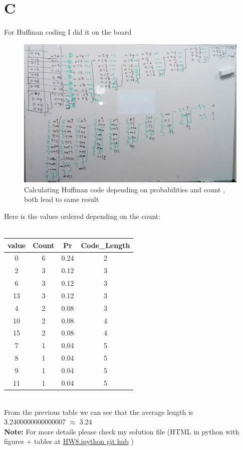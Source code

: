 \documentclass{article}
\begin{document}
 \section *{C}
For Huffman coding I did it on the board 
\begin{figure}[H]
\includegraphics[scale=0.15]{c_modified.jpg}
\caption{Calculating Huffman code depending on probabilities and count , both lead to same result}
\end{figure}
Here is the values ordered depending on the count:\\ \\ 
\begin{tabular}{|c|c|c|c|}
\hline
value&Count&Pr&Code\_Length\\ \hline 
0&6&0.24&2\\ \hline 
2&3&0.12&3\\ \hline 
6&3&0.12&3\\ \hline 
13&3&0.12&3\\ \hline 
4&2&0.08&3\\ \hline 
10&2&0.08&4\\ \hline 
15&2&0.08&4\\ \hline 
7&1&0.04&5\\ \hline 
8&1&0.04&5\\ \hline 
9&1&0.04&5\\ \hline 
11&1&0.04&5\\ \hline 
\end{tabular} \\

From the previous table we can see that the average length is 3.2400000000000007 \(\approx\) 3.24\\
\textbf{Note:} For more details please check my solution file (HTML in python with figures + tables at \href{https://github.com/aqeel13932/IP/blob/master/hw8/HW8.ipynb}{HW8.ipython git hub} )
\end{document}

